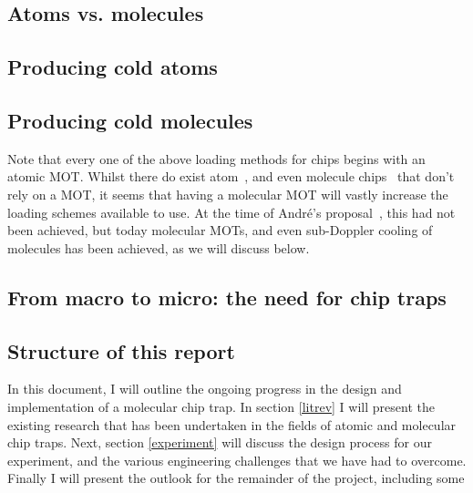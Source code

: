 \subsection{Atoms vs. molecules}

\subsection{Producing cold atoms}
\label{intro:coldatoms}

\subsection{Producing cold molecules}
\label{intro:coldmols}

Note that every one  of the above loading methods for
chips begins with an atomic MOT. Whilst there do exist atom~\cite{Dekker2000},
and even molecule chips~\cite{Bethlem2000. Meek2008} that don't rely on a MOT,
it seems that having a molecular MOT will vastly increase the loading schemes
available to use. At the time of Andr\'e's proposal~\cite{Andre2006}, this had
not been achieved, but today molecular MOTs, and even sub-Doppler cooling of
molecules has been achieved, as we will discuss below.

\subsection{From macro to micro: the need for chip traps}

\subsection{Structure of this report}

In this document, I will outline the ongoing progress in the design and
implementation of a molecular chip trap. In section \ref{litrev} I will present
the existing research that has been undertaken in the fields of atomic and
molecular chip traps. Next, section \ref{experiment} will discuss the design
process for our experiment, and the various engineering challenges that we have
had to overcome. Finally I will present the outlook for the remainder of the
project, including some 
